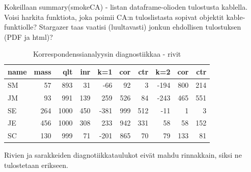 \documentclass[finnish,]{book}
\newenvironment{Shaded}{\begin{snugshade}}{\end{snugshade}}
\newcommand{\DataTypeTok}[1]{\textcolor[rgb]{0.13,0.29,0.53}{#1}}
\newcommand{\DecValTok}[1]{\textcolor[rgb]{0.00,0.00,0.81}{#1}}
\newcommand{\KeywordTok}[1]{\textcolor[rgb]{0.13,0.29,0.53}{\textbf{#1}}}
\newcommand{\NormalTok}[1]{#1}
\newcommand{\OperatorTok}[1]{\textcolor[rgb]{0.81,0.36,0.00}{\textbf{#1}}}
\newcommand{\OtherTok}[1]{\textcolor[rgb]{0.56,0.35,0.01}{#1}}
\newcommand{\StringTok}[1]{\textcolor[rgb]{0.31,0.60,0.02}{#1}}
\begin{document}
Kokeillaan summary(smokeCA) - listan dataframe-olioden tulostusta kablella. Voisi harkita funktiota, joka poimii CA:n tuloslistasta sopivat objektit kable-funktiolle? Stargazer taas vaatisi (luultavasti) jonkun ehdollisen tulostuksen (PDF ja html)?

\begin{Shaded}
\end{Shaded}

\begin{table}[t]

\caption{\label{tab:simpleCAtab1}Korrespondenssianalyysin diagnostiikkaa - rivit}
\centering
\begin{tabular}{lrrrrrrrrr}
\toprule
name & mass &  qlt &  inr &  k=1 & cor & ctr &  k=2 & cor & ctr\\
\midrule
SM & 57 & 893 & 31 & -66 & 92 & 3 & -194 & 800 & 214\\
JM & 93 & 991 & 139 & 259 & 526 & 84 & -243 & 465 & 551\\
SE & 264 & 1000 & 450 & -381 & 999 & 512 & -11 & 1 & 3\\
JE & 456 & 1000 & 308 & 233 & 942 & 331 & 58 & 58 & 152\\
SC & 130 & 999 & 71 & -201 & 865 & 70 & 79 & 133 & 81\\
\bottomrule
\end{tabular}
\end{table}

Rivien ja sarakkeiden diagnotiikkataulukot eivät mahdu rinnakkain, siksi ne tulostetaan erikseen.

\begin{Shaded}
\end{Shaded}
\end{document}
